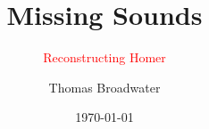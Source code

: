 
\title{Missing Sounds}
\subtitle{\textcolor{red}{Reconstructing Homer}}
\author{Thomas Broadwater}
\date{\today}